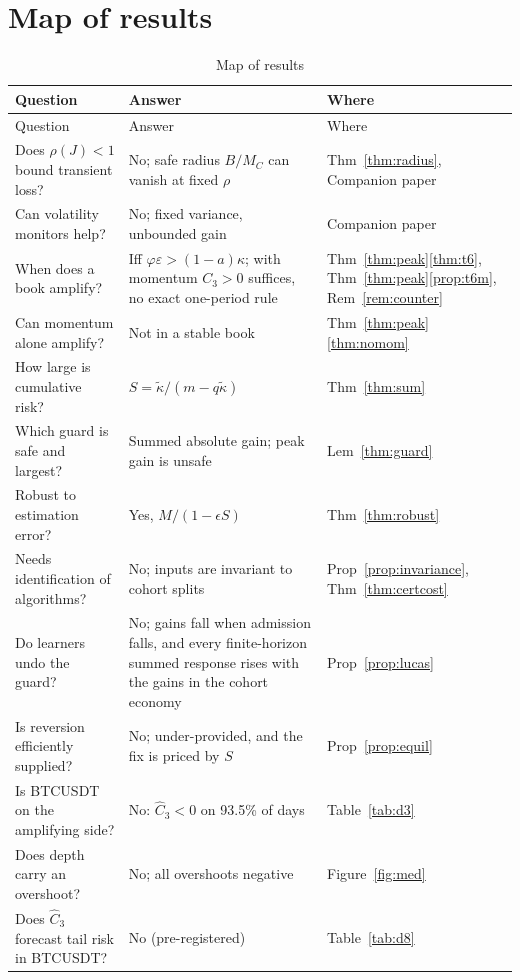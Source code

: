 \documentclass[12pt]{article}
\theoremstyle{definition}
\theoremstyle{remark}
\begin{document}
\section{Map of results}
{\footnotesize\singlespacing
\begin{longtable}{p{}p{}p{}}
\caption{Map of results}\label{tab:map}\\
\toprule
Question & Answer & Where\\
\midrule\endfirsthead\toprule Question & Answer & Where\\\midrule\endhead
Does $\rho(J)<1$ bound transient loss? & No; safe radius $B/M_C$ can vanish at fixed $\rho$ & Thm~\ref{thm:radius}, Companion paper\\
Can volatility monitors help? & No; fixed variance, unbounded gain & Companion paper\\
When does a book amplify? & Iff $\varphi\varepsilon>(1-a)\kappa$; with momentum $C_3>0$ suffices, no exact one-period rule & Thm~\ref{thm:peak}\ref{thm:t6}, Thm~\ref{thm:peak}\ref{prop:t6m}, Rem~\ref{rem:counter}\\
Can momentum alone amplify? & Not in a stable book & Thm~\ref{thm:peak}\ref{thm:nomom}\\
How large is cumulative risk? & $S=\tilde\kappa/(m-q\tilde\kappa)$ & Thm~\ref{thm:sum}\\
Which guard is safe and largest? & Summed absolute gain; peak gain is unsafe & Lem~\ref{thm:guard}\\
Robust to estimation error? & Yes, $M/(1-\epsilon S)$ & Thm~\ref{thm:robust}\\
Needs identification of algorithms? & No; inputs are invariant to cohort splits & Prop~\ref{prop:invariance}, Thm~\ref{thm:certcost}\\
Do learners undo the guard? & No; gains fall when admission falls, and every finite-horizon summed response rises with the gains in the cohort economy & Prop~\ref{prop:lucas}\\
Is reversion efficiently supplied? & No; under-provided, and the fix is priced by $S$ & Prop~\ref{prop:equil}\\
Is BTCUSDT on the amplifying side? & No: $\hat C_3<0$ on 93.5\% of days & Table~\ref{tab:d3}\\
Does depth carry an overshoot? & No; all overshoots negative & Figure~\ref{fig:med}\\
Does $\hat C_3$ forecast tail risk in BTCUSDT? & No (pre-registered) & Table~\ref{tab:d8}\\

\end{longtable}}
\end{document}
